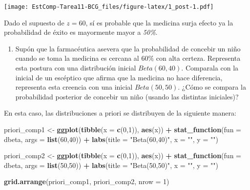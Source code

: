 \documentclass[]{article}
\newenvironment{Shaded}{\begin{snugshade}}{\end{snugshade}}
\newcommand{\DataTypeTok}[1]{\textcolor[rgb]{0.13,0.29,0.53}{#1}}
\newcommand{\DecValTok}[1]{\textcolor[rgb]{0.00,0.00,0.81}{#1}}
\newcommand{\KeywordTok}[1]{\textcolor[rgb]{0.13,0.29,0.53}{\textbf{#1}}}
\newcommand{\NormalTok}[1]{#1}
\newcommand{\OperatorTok}[1]{\textcolor[rgb]{0.81,0.36,0.00}{\textbf{#1}}}
\newcommand{\StringTok}[1]{\textcolor[rgb]{0.31,0.60,0.02}{#1}}
\providecommand{\tightlist}{%
  \setlength{\itemsep}{0pt}\setlength{\parskip}{0pt}}
\begin{document}
\texttt{[image: EstComp-Tarea11-BCG\_files/figure-latex/1\_post-1.pdf]}

Dado el supuesto de \(z = 60\), sí es probable que la medicina surja
efecto ya la probabilidad de éxito es mayormente mayor a \emph{50\%}.

\begin{enumerate}
\def\labelenumi{\alph{enumi})}
\setcounter{enumi}{2}
\tightlist
\item
  Supón que la farmacéutica asevera que la probabilidad de concebir un
  niño cuando se toma la medicina es cercana al \(60\%\) con alta
  certeza. Representa esta postura con una distribución inicial
  \(Beta(60,40)\). Comparala con la inicial de un escéptico que afirma
  que la medicina no hace diferencia, representa esta creencia con una
  inicial \(Beta(50,50)\). ¿Cómo se compara la probabilidad posterior de
  concebir un niño (usando las distintas iniciales)?
\end{enumerate}

En esta caso, las distribuciones a priori se distribuyen de la siguiente
manera:

\begin{Shaded}
\begin{Highlighting}[]
\NormalTok{priori_comp1 <-}\StringTok{ }\KeywordTok{ggplot}\NormalTok{(}\KeywordTok{tibble}\NormalTok{(}\DataTypeTok{x =} \KeywordTok{c}\NormalTok{(}\DecValTok{0}\NormalTok{,}\DecValTok{1}\NormalTok{)), }\KeywordTok{aes}\NormalTok{(x)) }\OperatorTok{+}
\StringTok{  }\KeywordTok{stat_function}\NormalTok{(}\DataTypeTok{fun =}\NormalTok{ dbeta, }\DataTypeTok{args =} \KeywordTok{list}\NormalTok{(}\DecValTok{60}\NormalTok{,}\DecValTok{40}\NormalTok{)) }\OperatorTok{+}
\StringTok{  }\KeywordTok{labs}\NormalTok{(}\DataTypeTok{title =} \StringTok{"Beta(60,40)"}\NormalTok{,}
    \DataTypeTok{x =} \StringTok{""}\NormalTok{,}
    \DataTypeTok{y =} \StringTok{""}\NormalTok{)}

\NormalTok{priori_comp2 <-}\StringTok{ }\KeywordTok{ggplot}\NormalTok{(}\KeywordTok{tibble}\NormalTok{(}\DataTypeTok{x =} \KeywordTok{c}\NormalTok{(}\DecValTok{0}\NormalTok{,}\DecValTok{1}\NormalTok{)), }\KeywordTok{aes}\NormalTok{(x)) }\OperatorTok{+}
\StringTok{  }\KeywordTok{stat_function}\NormalTok{(}\DataTypeTok{fun =}\NormalTok{ dbeta, }\DataTypeTok{args =} \KeywordTok{list}\NormalTok{(}\DecValTok{50}\NormalTok{,}\DecValTok{50}\NormalTok{)) }\OperatorTok{+}
\StringTok{  }\KeywordTok{labs}\NormalTok{(}\DataTypeTok{title =} \StringTok{"Beta(50,50)"}\NormalTok{,}
    \DataTypeTok{x =} \StringTok{""}\NormalTok{,}
    \DataTypeTok{y =} \StringTok{""}\NormalTok{)}

\KeywordTok{grid.arrange}\NormalTok{(priori_comp1, priori_comp2, }\DataTypeTok{nrow =} \DecValTok{1}\NormalTok{)}
\end{Highlighting}
\end{Shaded}
\end{document}
